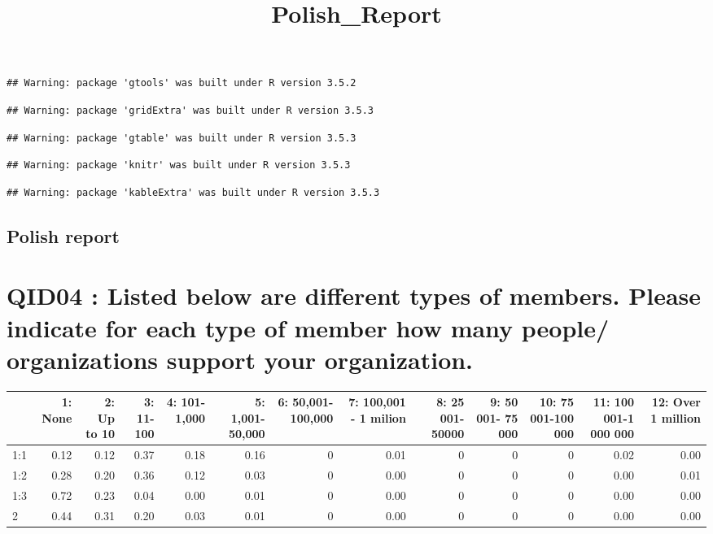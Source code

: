 \documentclass[]{article}
\title{Polish\_Report}
\author{}
\date{}
\begin{document}
\maketitle

\begin{verbatim}
## Warning: package 'gtools' was built under R version 3.5.2
\end{verbatim}

\begin{verbatim}
## Warning: package 'gridExtra' was built under R version 3.5.3
\end{verbatim}

\begin{verbatim}
## Warning: package 'gtable' was built under R version 3.5.3
\end{verbatim}

\begin{verbatim}
## Warning: package 'knitr' was built under R version 3.5.3
\end{verbatim}

\begin{verbatim}
## Warning: package 'kableExtra' was built under R version 3.5.3
\end{verbatim}

\subsection{Polish report}\label{polish-report}

\section{QID04 : Listed below are different types of members. Please
indicate for each type of member how many people/ organizations support
your
organization.}\label{qid04-listed-below-are-different-types-of-members.-please-indicate-for-each-type-of-member-how-many-people-organizations-support-your-organization.}

\begin{table}[H]
\centering\begingroup\fontsize{30}{32}\selectfont

\begin{tabular}{l|r|r|r|r|r|r|r|r|r|r|r|r}
\hline
  & 1: None &  2: Up to 10 &  3: 11-100 &  4: 101-1,000 &  5: 1,001-50,000 &  6: 50,001-100,000 &  7: 100,001 - 1 milion  &  8: 25 001-50000 &  9: 50 001- 75 000  &  10: 75 001-100 000 &  11: 100 001-1 000 000 &  12: Over 1 million\\
\hline
1:1 & 0.12 & 0.12 & 0.37 & 0.18 & 0.16 & 0 & 0.01 & 0 & 0 & 0 & 0.02 & 0.00\\
\hline
1:2 & 0.28 & 0.20 & 0.36 & 0.12 & 0.03 & 0 & 0.00 & 0 & 0 & 0 & 0.00 & 0.01\\
\hline
1:3 & 0.72 & 0.23 & 0.04 & 0.00 & 0.01 & 0 & 0.00 & 0 & 0 & 0 & 0.00 & 0.00\\
\hline
2 & 0.44 & 0.31 & 0.20 & 0.03 & 0.01 & 0 & 0.00 & 0 & 0 & 0 & 0.00 & 0.00\\
\hline
\end{tabular}
\endgroup{}
\end{table}
\end{document}
